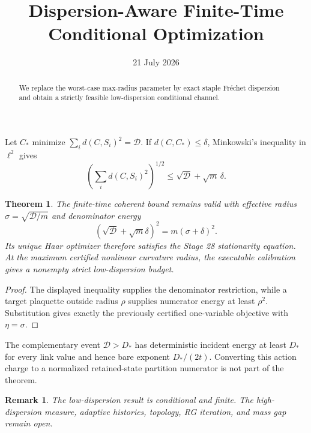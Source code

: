 \documentclass[11pt]{article}\usepackage[margin=1in]{geometry}\usepackage{amsmath,amsthm}\newtheorem{theorem}{Theorem}\newtheorem{remark}{Remark}
\title{Dispersion-Aware Finite-Time Conditional Optimization}\author{}\date{21 July 2026}
\begin{document}
\maketitle
\begin{abstract}We replace the worst-case max-radius parameter by exact staple Fr\'echet dispersion and obtain a strictly feasible low-dispersion conditional channel.\end{abstract}
Let $C_*$ minimize $\sum_i d(C,S_i)^2=\mathcal D$.  If $d(C,C_*)\le\delta$, Minkowski's inequality in $\ell^2$ gives
\[\left(\sum_i d(C,S_i)^2\right)^{1/2}\le \sqrt{\mathcal D}+\sqrt m\,\delta.\]
\begin{theorem}The finite-time coherent bound remains valid with effective radius $\sigma=\sqrt{\mathcal D/m}$ and denominator energy
\[(\sqrt{\mathcal D}+\sqrt m\delta)^2=m(\sigma+\delta)^2.\]
Its unique Haar optimizer therefore satisfies the Stage 28 stationarity equation. At the maximum certified nonlinear curvature radius, the executable calibration gives a nonempty strict low-dispersion budget.\end{theorem}
\begin{proof}The displayed inequality supplies the denominator restriction, while a target plaquette outside radius $\rho$ supplies numerator energy at least $\rho^2$. Substitution gives exactly the previously certified one-variable objective with $\eta=\sigma$.\end{proof}
The complementary event $\mathcal D>D_*$ has deterministic incident energy at least $D_*$ for every link value and hence bare exponent $D_*/(2t)$.  Converting this action charge to a normalized retained-state partition numerator is not part of the theorem.
\begin{remark}The low-dispersion result is conditional and finite. The high-dispersion measure, adaptive histories, topology, RG iteration, and mass gap remain open.\end{remark}
\end{document}
